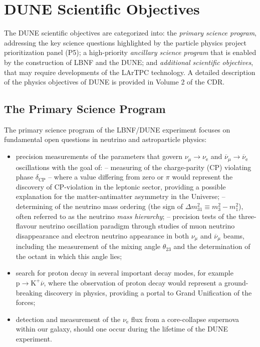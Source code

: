 \section{DUNE Scientific Objectives}
The DUNE scientific objectives are categorized into: the {\it primary science program}, addressing the key science questions 
highlighted by the particle physics project prioritization panel (P5); 
a high-priority {\it ancillary science program} that is 
enabled by the construction of LBNF and the DUNE; and {\it additional scientific objectives}, that may require developments 
of the LArTPC technology. A detailed description of the physics objectives of DUNE is provided in Volume 2 of the CDR.


\subsection{The Primary Science Program}

The primary science program of the LBNF/DUNE experiment focuses on fundamental open questions in neutrino and astroparticle physics: 
\begin{itemize}
  \item precision measurements of the parameters that govern $\nu_{\mu} \rightarrow \nu_\text{e}$ and
           $\overline{\nu}_{\mu} \rightarrow \overline{\nu}_\text{e}$ oscillations with the goal of:
  \subitem -- measuring of the charge-parity (CP) violating phase $\delta_\text{CP}$ -- where a value differing from zero or $\pi$ would represent the discovery of CP-violation in the leptonic sector, providing a possible explanation for the matter-antimatter asymmetry in the Universe;
  \subitem -- determining of the neutrino mass ordering (the sign of $\Delta m^2_{31} \equiv m_3^2-m_1^2$), often referred to as the neutrino {\it mass hierarchy};  
  \subitem -- precision tests of the three-flavour neutrino oscillation paradigm through studies of muon neutrino disappearance 
    and electron neutrino appearance in both $\nu_\mu$ and $\overline{\nu}_{\mu}$ beams, including the 
    measurement of the mixing angle $\theta_{23}$ and the determination of the octant in which this angle lies;
    \item search for proton decay in several important decay modes, for example $\text{p}\rightarrow\text{K}^+\overline{\nu}$, where the observation of proton decay would represent a ground-breaking discovery in physics, providing a portal to Grand Unification of the forces;
    \item detection and measurement of the $\nu_\text{e}$ flux from a core-collapse supernova within our galaxy, should one occur during the lifetime of the DUNE experiment.
\end{itemize}

